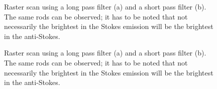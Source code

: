 \documentclass[journal=nalefd,manuscript=letter]{achemso}
\begin{document}
\begin{figure}[p]
\centering
	\caption{Raster scan using a long pass filter (a) and a short pass filter (b).
	The same rods can be observed; it has to be noted that not necessarily the
	brightest in the Stokes emission will be the brightest in the anti-Stokes.}
	\label{fig:shortpass_longpass}
\end{figure}

\begin{figure}[p]
\centering
	\caption{Raster scan using a long pass filter (a) and a short pass filter (b).
	The same rods can be observed; it has to be noted that not necessarily the
	brightest in the Stokes emission will be the brightest in the anti-Stokes.}
	\label{fig:Stokes_AS_with_dye}
\end{figure}
\end{document}
